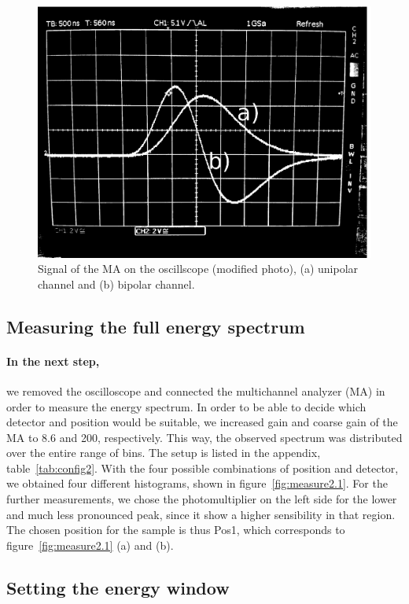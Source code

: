 \begin{figure}[htpb]
    \centering
    \includegraphics[width=0.8\linewidth]{figures/uni_bipolar2}
    \caption{Signal of the MA on the oscillscope (modified photo), 
        (a) unipolar channel and (b) bipolar channel.}
    \label{fig:uni_bipolar}
\end{figure}

\subsection{Measuring the full energy spectrum}
\label{ssub:Measuring the full energy spectrum}
\paragraph{In the next step,}
we removed the oscilloscope and connected the multichannel analyzer (MA)
in order to measure the energy spectrum. In order to be able to decide which detector and position would
be suitable, we increased gain and coarse gain of the MA to 8.6 and 200, respectively.
This way, the observed spectrum was distributed over the entire range of bins. 
The setup is listed in the appendix, table~\ref{tab:config2}. With the four possible combinations
of position and detector, we obtained four different histograms, shown in figure~\ref{fig:measure2.1}.
For the further measurements, we chose the photomultiplier on the left side for the lower and much less 
pronounced peak, since it show a higher sensibility in that region. The 
chosen position for the sample is thus Pos1, which corresponds to figure~\ref{fig:measure2.1} (a) and (b).

\subsection{Setting the energy window}
\label{ssub:Setting the energy window}
